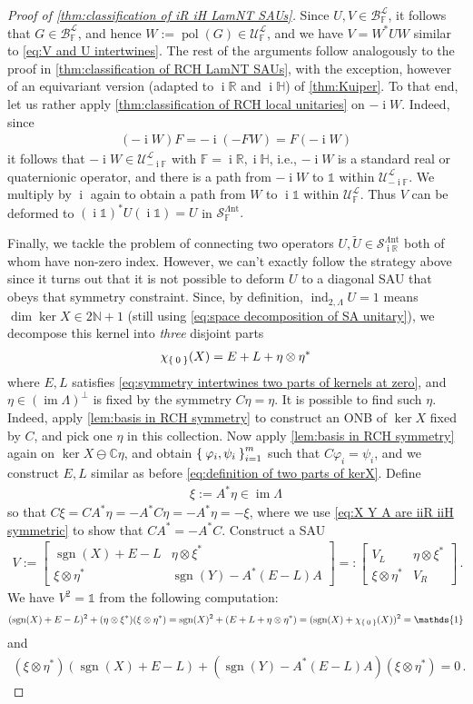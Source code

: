 \documentclass[a4paper,10pt]{article}
\numberwithin{equation}{section}
\theoremstyle{plain}
\theoremstyle{plain}
\theoremstyle{plain}
\theoremstyle{plain}
\theoremstyle{plain}
\theoremstyle{remark}
\theoremstyle{definition}
\theoremstyle{plain}
\newcommand{\ii}{\operatorname{i}}
\newcommand{\NN}{\mathbb{N}}
\newcommand{\RR}{\mathbb{R}}
\newcommand{\CC}{\mathbb{C}}
\newcommand{\FF}{\mathbb{F}}
\newcommand{\calB}{\mathcal{B}}
\newcommand{\calU}{\mathcal{U}}
\newcommand{\calSU}{\mathcal{S}}
\newcommand{\calL}{\mathcal{L}}
\newcommand{\ti}[1]{\widetilde{#1}}
\newcommand{\LamNT}{\Lambda\mathrm{nt}}
\newcommand{\LamNTSAU}{\calSU^{\LamNT}}
\newcommand{\vf}{\varphi}
\newcommand{\Id}{\mathds{1}}
\newcommand{\HH}{\mathbb{H}}
\newcommand{\sgn}{\operatorname{sgn}}
\newcommand{\findex}{\operatorname{ind}}
\newcommand{\im}{\operatorname{im}}
\newcommand{\eq}[1]{\begin{align*}#1\end{align*}}
\newcommand{\eql}[1]{\begin{align}#1\end{align}}
\newcommand{\polar}{\operatorname{pol}}
\begin{document}
\begin{proof}[Proof of \cref{thm:classification of iR iH LamNT SAUs}]
		Since $U,V\in\calB_\FF^\calL$, it follows that $G\in\calB_\FF^\calL$, and hence $W:=\polar(G)\in\calU^\calL_\FF$, and we have $V=W^*UW$ similar to \cref{eq:V and U intertwines}. The rest of the arguments follow analogously to the proof in \cref{thm:classification of RCH LamNT SAUs}, with the exception, however of an equivariant version (adapted to $\ii\RR$ and $\ii\HH$) of \cref{thm:Kuiper}. To that end, let us rather apply \cref{thm:classification of RCH local unitaries} on $-\ii W$. Indeed, since \eq{(-\ii W)F=-\ii (-FW)=F(-\ii W)} it follows that $-\ii W\in\calU^\calL_{-\ii \FF}$ with $\FF=\ii\RR,\ii\HH$, i.e., $-\ii W$ is a standard real or quaternionic operator, and there is a path from $-\ii W$ to $\Id$ within $\calU^\calL_{-\ii \FF}$. We multiply by $\ii$ again to obtain a path from $W$ to $\ii \Id$ within $\calU^\calL_\FF.$ Thus $V$ can be deformed to $(\ii \Id)^* U (\ii \Id)=U$ in $\LamNTSAU_\FF.$ 
		
		
		Finally, we tackle the problem of connecting two operators $U,\ti{U}\in\LamNTSAU_{\ii \RR}$ both of whom have non-zero index. However, we can't exactly follow the strategy above since it turns out that it is not possible to deform $U$ to a diagonal SAU that obeys that symmetry constraint. Since, by definition, $\findex_{2,\Lambda} U = 1$ means $\dim \ker X \in 2\NN+1$ (still using \cref{eq:space decomposition of SA unitary}), we decompose this kernel into \emph{three} disjoint parts \eq{\chi_{\Set{0}}(X)=E+L+\eta\otimes \eta^*} where $E,L$ satisfies \cref{eq:symmetry intertwines two parts of kernels at zero}, and $\eta\in(\im\Lambda)^\perp$ is fixed by the symmetry $C\eta=\eta$. It is possible to find such $\eta.$ Indeed, apply \cref{lem:basis in RCH symmetry} to construct an ONB of $\ker X$ fixed by $C$, and pick one $\eta$ in this collection. Now apply \cref{lem:basis in RCH symmetry} again on $\ker X \ominus\CC\eta$, and obtain $\Set{\vf_i,\psi_i}_{i=1}^m$ such that $C\vf_i=\psi_i$, and we construct $E,L$ similar as before \cref{eq:definition of two parts of kerX}. 
		Define \eql{\label{eq:define xi in iiR case}\xi:=  A^*\eta \in\im \Lambda} so that  $C\xi=CA^*\eta = -A^*C\eta =-A^*\eta =-\xi$, where we use \cref{eq:X Y A are iiR iiH symmetric} to show that $CA^*=-A^*C$.
		Construct a SAU \eql{\label{eq:V non diagonal}V:=\begin{bmatrix}\sgn(X)+E-L & \eta\otimes \xi^* \\ \xi\otimes \eta^* & \sgn(Y)-A^*(E-L)A\end{bmatrix}=:\begin{bmatrix}V_L & \eta\otimes \xi^* \\ \xi\otimes \eta^* & V_R\end{bmatrix}\,.} 
		We have $V^2=\Id$ from the following computation: \eq{(\sgn(X)+E-L)^2+(\eta\otimes\xi^*) (\xi\otimes \eta^*)=\sgn(X)^2+(E+L+\eta\otimes \eta^*)=(\sgn(X)+\chi_{\Set{0}}(X))^2=\Id} and \eq{(\xi\otimes\eta^*)(\sgn(X)+E-L)+(\sgn(Y)-A^*(E-L)A)(\xi\otimes\eta^*)=0\,.}
		

\end{proof}
\end{document}
